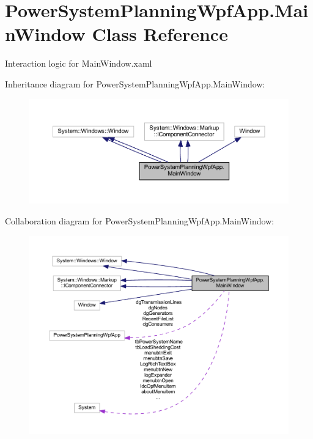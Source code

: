 \hypertarget{class_power_system_planning_wpf_app_1_1_main_window}{}\section{Power\+System\+Planning\+Wpf\+App.\+Main\+Window Class Reference}
\label{class_power_system_planning_wpf_app_1_1_main_window}


Interaction logic for Main\+Window.\+xaml  




Inheritance diagram for Power\+System\+Planning\+Wpf\+App.\+Main\+Window\+:\nopagebreak
\begin{figure}[H]
\begin{center}
\leavevmode
\includegraphics[width=350pt]{class_power_system_planning_wpf_app_1_1_main_window__inherit__graph}
\end{center}
\end{figure}


Collaboration diagram for Power\+System\+Planning\+Wpf\+App.\+Main\+Window\+:\nopagebreak
\begin{figure}[H]
\begin{center}
\leavevmode
\includegraphics[width=350pt]{class_power_system_planning_wpf_app_1_1_main_window__coll__graph}
\end{center}
\end{figure}
